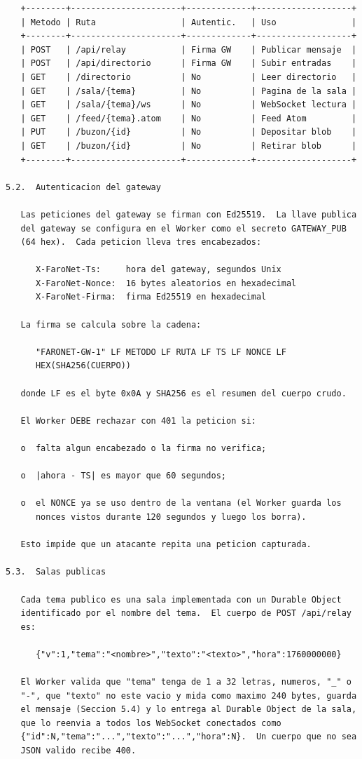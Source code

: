 \newpage
\begin{Verbatim}
   +--------+----------------------+-------------+-------------------+
   | Metodo | Ruta                 | Autentic.   | Uso               |
   +--------+----------------------+-------------+-------------------+
   | POST   | /api/relay           | Firma GW    | Publicar mensaje  |
   | POST   | /api/directorio      | Firma GW    | Subir entradas    |
   | GET    | /directorio          | No          | Leer directorio   |
   | GET    | /sala/{tema}         | No          | Pagina de la sala |
   | GET    | /sala/{tema}/ws      | No          | WebSocket lectura |
   | GET    | /feed/{tema}.atom    | No          | Feed Atom         |
   | PUT    | /buzon/{id}          | No          | Depositar blob    |
   | GET    | /buzon/{id}          | No          | Retirar blob      |
   +--------+----------------------+-------------+-------------------+

5.2.  Autenticacion del gateway

   Las peticiones del gateway se firman con Ed25519.  La llave publica
   del gateway se configura en el Worker como el secreto GATEWAY_PUB
   (64 hex).  Cada peticion lleva tres encabezados:

      X-FaroNet-Ts:     hora del gateway, segundos Unix
      X-FaroNet-Nonce:  16 bytes aleatorios en hexadecimal
      X-FaroNet-Firma:  firma Ed25519 en hexadecimal

   La firma se calcula sobre la cadena:

      "FARONET-GW-1" LF METODO LF RUTA LF TS LF NONCE LF
      HEX(SHA256(CUERPO))

   donde LF es el byte 0x0A y SHA256 es el resumen del cuerpo crudo.

   El Worker DEBE rechazar con 401 la peticion si:

   o  falta algun encabezado o la firma no verifica;

   o  |ahora - TS| es mayor que 60 segundos;

   o  el NONCE ya se uso dentro de la ventana (el Worker guarda los
      nonces vistos durante 120 segundos y luego los borra).

   Esto impide que un atacante repita una peticion capturada.

5.3.  Salas publicas

   Cada tema publico es una sala implementada con un Durable Object
   identificado por el nombre del tema.  El cuerpo de POST /api/relay
   es:

      {"v":1,"tema":"<nombre>","texto":"<texto>","hora":1760000000}

   El Worker valida que "tema" tenga de 1 a 32 letras, numeros, "_" o
   "-", que "texto" no este vacio y mida como maximo 240 bytes, guarda
   el mensaje (Seccion 5.4) y lo entrega al Durable Object de la sala,
   que lo reenvia a todos los WebSocket conectados como
   {"id":N,"tema":"...","texto":"...","hora":N}.  Un cuerpo que no sea
   JSON valido recibe 400.
\end{Verbatim}
